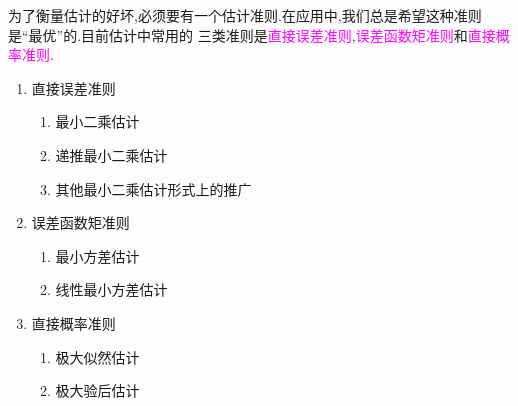 \documentclass[cn,10pt,citestyle=gb7714-2015,bibstyle=gb7714-2015]{elegantbook}
\begin{document}
为了衡量估计的好坏,必须要有一个估计准则.在应用中,我们总是希望这种准则是“最优”的.目前估计中常用的
三类准则是\textcolor{magenta}{直接误差准则},\textcolor{magenta}{误差函数矩准则}和\textcolor{magenta}{直接概率准则}.
\begin{enumerate}
  \item 直接误差准则
  \begin{enumerate}
    \item 最小二乘估计
    \item 递推最小二乘估计
    \item 其他最小二乘估计形式上的推广
  \end{enumerate}
  \item 误差函数矩准则
  \begin{enumerate}
    \item 最小方差估计
    \item 线性最小方差估计
  \end{enumerate}
  \item 直接概率准则
  \begin{enumerate}
    \item 极大似然估计
    \item 极大验后估计
  \end{enumerate}
\end{enumerate}
\end{document}
